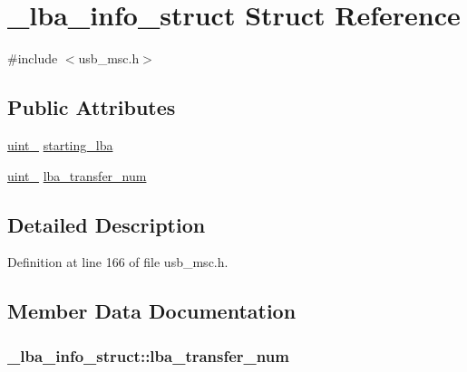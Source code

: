 \hypertarget{struct__lba__info__struct}{}\section{\+\_\+lba\+\_\+info\+\_\+struct Struct Reference}
\label{struct__lba__info__struct}


{\ttfamily \#include $<$usb\+\_\+msc.\+h$>$}

\subsection*{Public Attributes}
\begin{DoxyCompactItemize}
\item 
\hyperlink{types_8h_a5532400b872b4aa84e54335bf458a318}{uint\+\_} \hyperlink{struct__lba__info__struct_ac9fe7fe181a4a1d194842271c5da83a9}{starting\+\_\+lba}
\item 
\hyperlink{types_8h_a5532400b872b4aa84e54335bf458a318}{uint\+\_} \hyperlink{struct__lba__info__struct_a2b260c7658848cedcfaea0622dd5b40c}{lba\+\_\+transfer\+\_\+num}
\end{DoxyCompactItemize}


\subsection{Detailed Description}


Definition at line 166 of file usb\+\_\+msc.\+h.



\subsection{Member Data Documentation}
\subsubsection[{\texorpdfstring{lba\+\_\+transfer\+\_\+num}{lba_transfer_num}}]{ \+\_\+lba\+\_\+info\+\_\+struct\+::lba\+\_\+transfer\+\_\+num}\hypertarget{struct__lba__info__struct_a2b260c7658848cedcfaea0622dd5b40c}{}\label{struct__lba__info__struct_a2b260c7658848cedcfaea0622dd5b40c}


